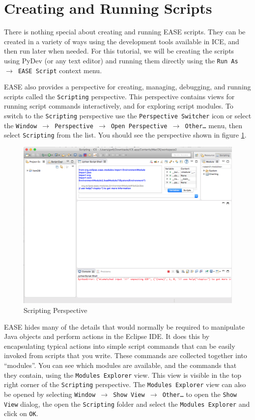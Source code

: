 \section{Creating and Running Scripts}

There is nothing special about creating and running EASE scripts. They can be
created in a variety of ways using the development tools available in ICE, and
then run later when needed. For this tutorial, we will be creating the scripts
using PyDev (or any text editor) and running them directly using the \texttt{Run As
$\rightarrow$ EASE Script} context menu.

EASE also provides a perspective for creating, managing, debugging, and running
scripts called the \texttt{Scripting} perspective. This perspective contains
views for running script commands interactively, and for exploring script modules.
To switch to the \texttt{Scripting} perspective use the \texttt{Perspective
Switcher} icon or select the \texttt{Window $\rightarrow$ Perspective
$\rightarrow$ Open Perspective $\rightarrow$ Other\ldots} menu, then select 
\texttt{Scripting} from the list. You should see the perspective shown in figure
\ref{fig:perspective}.

\begin{figure}[!ht]
\centering
\includegraphics[width=\textwidth]{images/perspective.png}
\caption{Scripting Perspective}
\label{fig:perspective}
\end{figure}

EASE hides many of the details that would normally be required to manipulate
Java objects and perform actions in the Eclipse IDE. It does this by
encapsulating typical actions into simple script commands that can be easily
invoked from scripts that you write. These commands are collected together into
``modules''. You can see which modules are available, and the commands that they
contain, using the \texttt{Modules Explorer} view. This view is visible in
the top right corner of the \texttt{Scripting} perspective. The \texttt{Modules
Explorer} view can also be opened by selecting \texttt{Window $\rightarrow$ Show
View $\rightarrow$ Other\ldots} to open the \texttt{Show View} dialog, the open
the \texttt{Scripting} folder and select the \texttt{Modules Explorer} and click
on \texttt{OK}.


